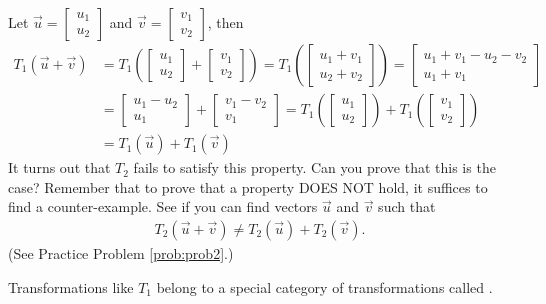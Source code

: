 \documentclass{ximera}
\begin{document}
\begin{initprob}
Let $\vec{u}=\begin{bmatrix}
u_1\\
u_2
\end{bmatrix}$ and $\vec{v}=\begin{bmatrix}
v_1\\
v_2
\end{bmatrix}$, then
\begin{align*}
T_1(\vec{u}+\vec{v})&=T_1\left(\begin{bmatrix}
u_1\\
u_2
\end{bmatrix}+\begin{bmatrix}
v_1\\
v_2
\end{bmatrix}\right)=T_1\left(\begin{bmatrix}
u_1+v_1\\
u_2+v_2
\end{bmatrix}\right)=\begin{bmatrix}
u_1+v_1-u_2-v_2\\
u_1+v_1
\end{bmatrix}\\
&=\begin{bmatrix}
u_1-u_2\\
u_1
\end{bmatrix}+\begin{bmatrix}
v_1-v_2\\
v_1
\end{bmatrix}=T_1\left(\begin{bmatrix}
u_1\\
u_2
\end{bmatrix}\right)+T_1\left(\begin{bmatrix}
v_1\\
v_2
\end{bmatrix}\right)\\
&=T_1(\vec{u})+T_1(\vec{v})
\end{align*}
It turns out that $T_2$ fails to satisfy this property.  Can you prove that this is the case?  Remember that to prove that a property DOES NOT hold, it suffices to find a counter-example.  See if you can find vectors $\vec{u}$ and $\vec{v}$ such that 
\begin{align}\label{t2}T_2(\vec{u}+\vec{v}) \neq T_2(\vec{u})+T_2(\vec{v}).\end{align}
(See Practice Problem \ref{prob:prob2}.) 
\end{initprob}
Transformations like $T_1$ belong to a special category of transformations called .
\end{document}
